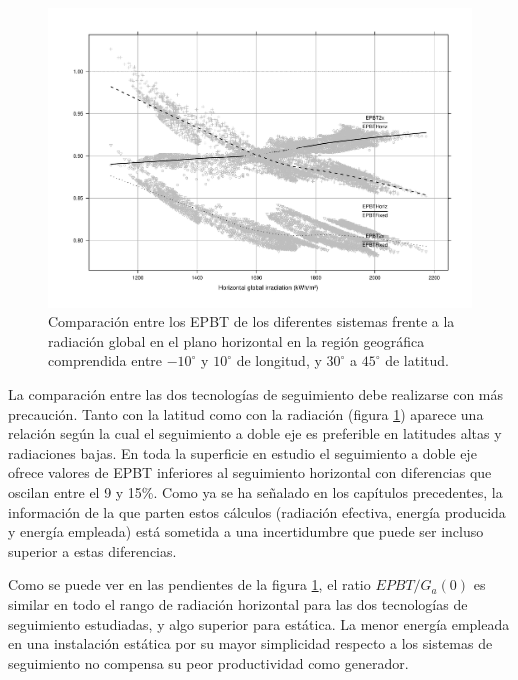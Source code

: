 \begin{figure}[p]
\begin{centering}
\includegraphics[height=0.38\textheight]{../figs/EPBTEuropavsGh2}
\par\end{centering}

\caption{\label{EPBTComparaGh}Comparación entre los EPBT de los
  diferentes sistemas frente a la radiación global en el plano
  horizontal en la región geográfica comprendida entre $-10^{\circ}$ y
  $10^{\circ}$ de longitud, y $30^{\circ}$ a $45^{\circ}$ de latitud.}
\end{figure}

La comparación entre las dos tecnologías de seguimiento debe
realizarse con más precaución. Tanto con la latitud como con la
radiación (figura \ref{EPBTComparaGh}) aparece una relación según la
cual el seguimiento a doble eje es preferible en latitudes altas y
radiaciones bajas. En toda la superficie en estudio el seguimiento a
doble eje ofrece valores de EPBT inferiores al seguimiento horizontal
con diferencias que oscilan entre el 9 y 15\%. Como ya se ha señalado
en los capítulos precedentes, la información de la que parten estos
cálculos (radiación efectiva, energía producida y energía empleada)
está sometida a una incertidumbre que puede ser incluso superior a
estas diferencias. 

Como se puede ver en las pendientes de la figura \ref{EPBTComparaGh},
el ratio $EPBT/G_{a}(0)$ es similar en todo el rango de radiación
horizontal para las dos tecnologías de seguimiento estudiadas, y algo
superior para estática. La menor energía empleada en una instalación
estática por su mayor simplicidad respecto a los sistemas de
seguimiento no compensa su peor productividad como generador.

